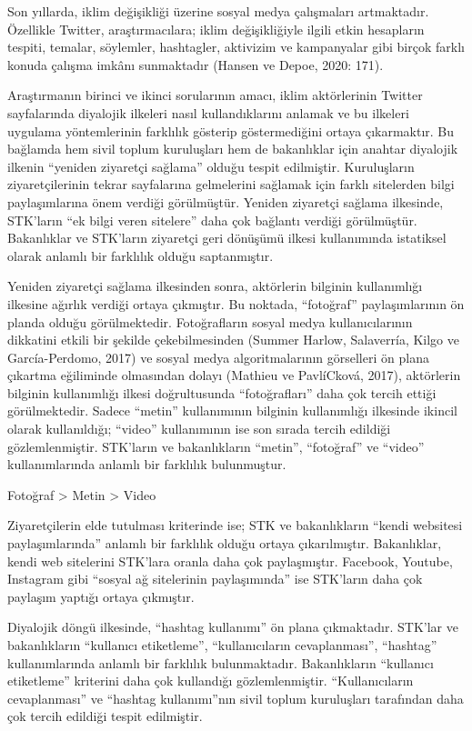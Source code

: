 \documentclass[
]{book}
\begin{document}
Son yıllarda, iklim değişikliği üzerine sosyal medya çalışmaları artmaktadır. Özellikle Twitter, araştırmacılara; iklim değişikliğiyle ilgili etkin hesapların tespiti, temalar, söylemler, hashtagler, aktivizim ve kampanyalar gibi birçok farklı konuda çalışma imkânı sunmaktadır (Hansen ve Depoe, 2020: 171).

Araştırmanın birinci ve ikinci sorularının amacı, iklim aktörlerinin Twitter sayfalarında diyalojik ilkeleri nasıl kullandıklarını anlamak ve bu ilkeleri uygulama yöntemlerinin farklılık gösterip göstermediğini ortaya çıkarmaktır. Bu bağlamda hem sivil toplum kuruluşları hem de bakanlıklar için anahtar diyalojik ilkenin ``yeniden ziyaretçi sağlama'' olduğu tespit edilmiştir. Kuruluşların ziyaretçilerinin tekrar sayfalarına gelmelerini sağlamak için farklı sitelerden bilgi paylaşımlarına önem verdiği görülmüştür. Yeniden ziyaretçi sağlama ilkesinde, STK'ların ``ek bilgi veren sitelere'' daha çok bağlantı verdiği görülmüştür. Bakanlıklar ve STK'ların ziyaretçi geri dönüşümü ilkesi kullanımında istatiksel olarak anlamlı bir farklılık olduğu saptanmıştır.

Yeniden ziyaretçi sağlama ilkesinden sonra, aktörlerin bilginin kullanımlığı ilkesine ağırlık verdiği ortaya çıkmıştır. Bu noktada, ``fotoğraf'' paylaşımlarının ön planda olduğu görülmektedir. Fotoğrafların sosyal medya kullanıcılarının dikkatini etkili bir şekilde çekebilmesinden (Summer Harlow, Salaverría, Kilgo ve García-Perdomo, 2017) ve sosyal medya algoritmalarının görselleri ön plana çıkartma eğiliminde olmasından dolayı (Mathieu ve PavlíCková, 2017), aktörlerin bilginin kullanımlığı ilkesi doğrultusunda ``fotoğrafları'' daha çok tercih ettiği görülmektedir. Sadece ``metin'' kullanımının bilginin kullanımlığı ilkesinde ikincil olarak kullanıldığı; ``video'' kullanımının ise son sırada tercih edildiği gözlemlenmiştir. STK'ların ve bakanlıkların ``metin'', ``fotoğraf'' ve ``video'' kullanımlarında anlamlı bir farklılık bulunmuştur.

Fotoğraf \textgreater{} Metin \textgreater{} Video

Ziyaretçilerin elde tutulması kriterinde ise; STK ve bakanlıkların ``kendi websitesi paylaşımlarında'' anlamlı bir farklılık olduğu ortaya çıkarılmıştır. Bakanlıklar, kendi web sitelerini STK'lara oranla daha çok paylaşmıştır. Facebook, Youtube, Instagram gibi ``sosyal ağ sitelerinin paylaşımında'' ise STK'ların daha çok paylaşım yaptığı ortaya çıkmıştır.

Diyalojik döngü ilkesinde, ``hashtag kullanımı'' ön plana çıkmaktadır. STK'lar ve bakanlıkların ``kullanıcı etiketleme'', ``kullanıcıların cevaplanması'', ``hashtag'' kullanımlarında anlamlı bir farklılık bulunmaktadır. Bakanlıkların ``kullanıcı etiketleme'' kriterini daha çok kullandığı gözlemlenmiştir. ``Kullanıcıların cevaplanması'' ve ``hashtag kullanımı''nın sivil toplum kuruluşları tarafından daha çok tercih edildiği tespit edilmiştir.
\end{document}
